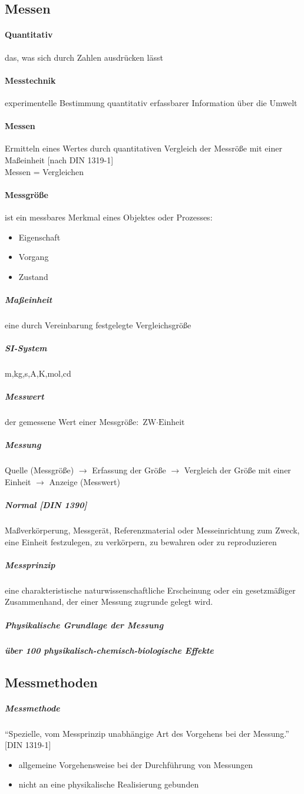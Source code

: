 \documentclass[a4paper]{scrartcl}
\begin{document}
\subsection{Messen}
\paragraph{Quantitativ} das, was sich durch Zahlen ausdrücken lässt
\paragraph{Messtechnik} experimentelle Bestimmung quantitativ erfassbarer Information über die Umwelt
\paragraph{Messen} Ermitteln eines Wertes durch quantitativen Vergleich der Messröße mit einer Maßeinheit [nach DIN 1319-1]\\
Messen = Vergleichen
\paragraph{Messgröße} ist ein messbares Merkmal eines Objektes oder Prozesses:
\begin{itemize}
\item Eigenschaft
\item Vorgang
\item Zustand
\end{itemize}
\subparagraph{Maßeinheit} eine durch Vereinbarung festgelegte Vergleichsgröße
\subparagraph{SI-System} m,kg,s,A,K,mol,cd
\subparagraph{Messwert} der gemessene Wert einer Messgröße: $\text{ZW} \cdot \text{Einheit}$
\subparagraph{Messung} Quelle (Messgröße) $\rightarrow$ Erfassung der Größe $\rightarrow$ Vergleich der Größe mit einer Einheit $\rightarrow$ Anzeige (Messwert)
\subparagraph{Normal [DIN 1390]} Maßverkörperung, Messgerät, Referenzmaterial oder Messeinrichtung zum Zweck, eine Einheit festzulegen, zu verkörpern, zu bewahren oder zu reproduzieren

\subparagraph{Messprinzip} eine charakteristische naturwissenschaftliche Erscheinung oder ein gesetzmäßiger Zusammenhand, der einer Messung zugrunde gelegt wird.

\subparagraph{Physikalische Grundlage der Messung}

\subparagraph{über 100 physikalisch-chemisch-biologische Effekte}

\subsection{Messmethoden}
\subparagraph{Messmethode}  "`Spezielle, vom Messprinzip unabhängige Art des Vorgehens bei der Messung."' [DIN 1319-1]
\begin{itemize}
\item allgemeine Vorgehensweise bei der Durchführung von Messungen
\item nicht an eine physikalische Realisierung gebunden
\end{itemize}
\end{document}
